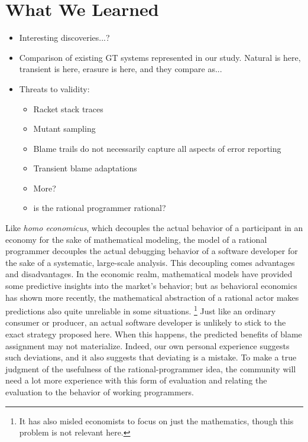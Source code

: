 \section{What We Learned}

\begin{itemize}
  \item Interesting discoveries...?

  \item Comparison of existing GT systems represented in our study.  
    Natural is here, transient is here, erasure is here, and they
        compare as...

      \item Threats to validity:
        \begin{itemize}
          \item Racket stack traces
          \item Mutant sampling
          \item Blame trails do not necessarily capture all aspects of error reporting
          \item Transient blame adaptations
          \item More?

	  \item is the rational programmer rational? 

        \end{itemize}
\end{itemize}        


Like {\em homo economicus\/}, which decouples the actual behavior of a
participant in an economy for the sake of mathematical modeling, the
model of a rational programmer decouples the actual debugging behavior
of a software developer for the sake of a systematic, large-scale
analysis. This decoupling comes advantages and disadvantages. In the
economic realm, mathematical models have provided some predictive
insights into the market's behavior; but as behavioral economics has
shown more recently, the mathematical abstraction of a rational actor
makes predictions also quite unreliable in some situations.
\footnote{It has also misled economists to focus on just the
mathematics, though this problem is not relevant here.}  Just like an
ordinary consumer or producer, an actual software developer is
unlikely to stick to the exact strategy proposed here. When this
happens, the predicted benefits of blame assignment may not
materialize. Indeed, our own personal experience suggests such
deviations, and it also suggests that deviating is a mistake. To make
a true judgment of the usefulness of the rational-programmer idea, the
community will need a lot more experience with this form of evaluation
and relating the evaluation to the behavior of working programmers. 


